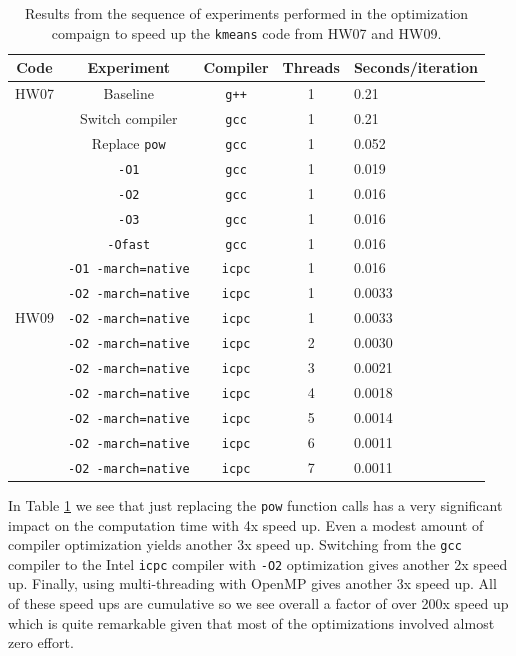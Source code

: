 \begin{table}[htbp!]
    \centering
    \begin{tabular}{c|c|c|c|l} \hline
     Code & Experiment & Compiler     & Threads &  Seconds/iteration \\ \hline
     HW07 & Baseline             & \texttt{g++} & 1      & 0.21 \\
     & Switch compiler      & \texttt{gcc} & 1     & 0.21 \\
     & Replace \texttt{pow} & \texttt{gcc} & 1    & 0.052 \\
     & \texttt{-O1}     & \texttt{gcc} & 1    & 0.019 \\
     & \texttt{-O2}     & \texttt{gcc} & 1    & 0.016 \\
     & \texttt{-O3}     & \texttt{gcc} & 1    & 0.016 \\
     & \texttt{-Ofast}  & \texttt{gcc} & 1    & 0.016 \\ 
     & \texttt{-O1 -march=native} & \texttt{icpc} & 1 & 0.016 \\
     & \texttt{-O2 -march=native} & \texttt{icpc} & 1 & 0.0033 \\ \hline
     HW09 & \texttt{-O2 -march=native} & \texttt{icpc} & 1 & 0.0033 \\
     & \texttt{-O2 -march=native} & \texttt{icpc} & 2 & 0.0030 \\
     & \texttt{-O2 -march=native} & \texttt{icpc} & 3 & 0.0021 \\
     & \texttt{-O2 -march=native} & \texttt{icpc} & 4 & 0.0018 \\
      & \texttt{-O2 -march=native} & \texttt{icpc} & 5 & 0.0014 \\
      & \texttt{-O2 -march=native} & \texttt{icpc} & 6 & 0.0011 \\
       & \texttt{-O2 -march=native} & \texttt{icpc} & 7 & 0.0011 \\ \hline
    \end{tabular}     
    \caption{Results from the sequence of experiments performed in the optimization compaign to speed up the \texttt{kmeans} code from HW07 and HW09. }
    \label{kmeansOptimizationResults.tab}
\end{table}

 In Table \ref{kmeansOptimizationResults.tab} we see that just replacing the \texttt{pow} function calls has a very significant impact on the computation time with 4x speed up. Even a modest amount of compiler optimization yields another 3x speed up. Switching from the \texttt{gcc} compiler to the Intel \texttt{icpc} compiler with \texttt{-O2} optimization gives another 2x speed up. Finally, using multi-threading with OpenMP gives another 3x speed up. All of these speed ups are cumulative so we see overall a factor of over 200x speed up which is quite remarkable given that most of the optimizations involved almost zero effort. 
 
